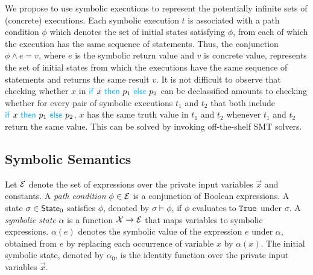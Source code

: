 We propose to use symbolic executions to represent the potentially infinite sets of (concrete) executions. %
Each symbolic execution $t$ is associated with a path condition $\phi$ which denotes the set of initial states satisfying $\phi$, from each of which the execution  has the same sequence of statements.
Thus, the conjunction $\phi\wedge e=v$, where $e$ is the symbolic return value and $v$ is concrete value,
represents the set of initial states from which the executions have the same sequence of statements
and returns the same result $v$. It is not difficult to observe that checking  whether $x$ in ${\Pif} \ x \ {\Pthen} \  p_1 \ {\Pelse} \ p_2$
can be declassified amounts to checking whether for every pair of symbolic executions
$t_1$ and $t_2$ that both include ${\Pif} \ x \ {\Pthen} \  p_1 \ {\Pelse} \ p_2$,
$x$ has the same truth value in $t_1$ and $t_2$ whenever $t_1$ and $t_2$ return the same value. This can be solved
by invoking off-the-shelf SMT solvers.



\subsection{Symbolic Semantics}
Let $\mathcal{E}$ denote the set of expressions over the private input variables $\vec{x}$ and constants.
A \emph{path condition} $\phi\in\mathcal{E}$ is a conjunction of Boolean expressions.
A state $\sigma\in{\sf State}_0$ satisfies $\phi$, denoted by $\sigma\models \phi$, if
$\phi$ evaluates to ${\tt True}$ under $\sigma$. %
A \emph{symbolic state} $\alpha$ is a function $\mathcal{X}\rightarrow \mathcal{E}$ that maps variables to symbolic
expressions. $\alpha(e)$ denotes the symbolic value of the expression
$e$ under $\alpha$, obtained from $e$ by replacing each occurrence
of variable $x$ by $\alpha(x)$.
The initial symbolic state, denoted by $\alpha_0$,
is the identity function over the private input variables $\vec{x}$.



